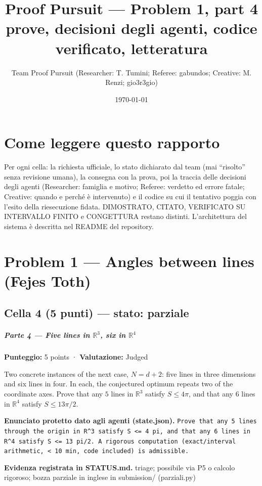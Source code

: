 \documentclass[11pt,a4paper]{article}
\title{Proof Pursuit --- Problem 1, part 4\\ \large prove, decisioni degli agenti, codice verificato, letteratura}
\author{Team Proof Pursuit (Researcher: T. Tumini; Referee: gabundos; Creative: M. Renzi; gio3r3gio)}
\date{\today}
\begin{document}
\maketitle\tableofcontents
\section*{Come leggere questo rapporto}
Per ogni cella: la richiesta ufficiale, lo stato dichiarato dal team (mai ``risolto'' senza revisione umana), la consegna
con la prova, poi la traccia delle decisioni degli agenti (Researcher: famiglia e motivo; Referee: verdetto ed errore
fatale; Creative: quando e perché è intervenuto) e il codice su cui il tentativo poggia con l'esito della riesecuzione
fidata. DIMOSTRATO, CITATO, VERIFICATO SU INTERVALLO FINITO e CONGETTURA restano distinti. L'architettura del sistema
è descritta nel README del repository.
\section{Problem 1 — Angles between lines (Fejes Toth)}
\subsection{Cella 4 (5 punti) — stato: parziale}
\subparagraph{\texorpdfstring{Parte 4 --- Five lines in
\(\mathbb{R}^3\), six in
\(\mathbb{R}^4\)}{Parte 4 --- Five lines in \textbackslash mathbb\{R\}\^{}3, six in \textbackslash mathbb\{R\}\^{}4}}\label{parte-4-five-lines-in-mathbbr3-six-in-mathbbr4}

\textbf{Punteggio:} 5 points · \textbf{Valutazione:} Judged

Two concrete instances of the next case, \(N = d+2\): five lines in
three dimensions and six lines in four. In each, the conjectured optimum
repeats two of the coordinate axes. Prove that any \(5\) lines in
\(\mathbb{R}^3\) satisfy \(S \le 4\pi\), and that any \(6\) lines in
\(\mathbb{R}^4\) satisfy \(S \le 13\pi/2\).

\textbf{Enunciato protetto dato agli agenti (state.json).} \texttt{Prove that any 5 lines through the origin in R\textasciicircum{}3 satisfy S \textless{}= 4 pi, and that any 6 lines in R\textasciicircum{}4 satisfy S \textless{}= 13 pi/2. A rigorous computation (exact/interval arithmetic, \textless{} 10 min, code included) is admissible.}

\textbf{Evidenza registrata in STATUS.md.} triage; possibile via P5 o calcolo rigoroso; bozza parziale in inglese in submission/ (parziali.py)
\end{document}
